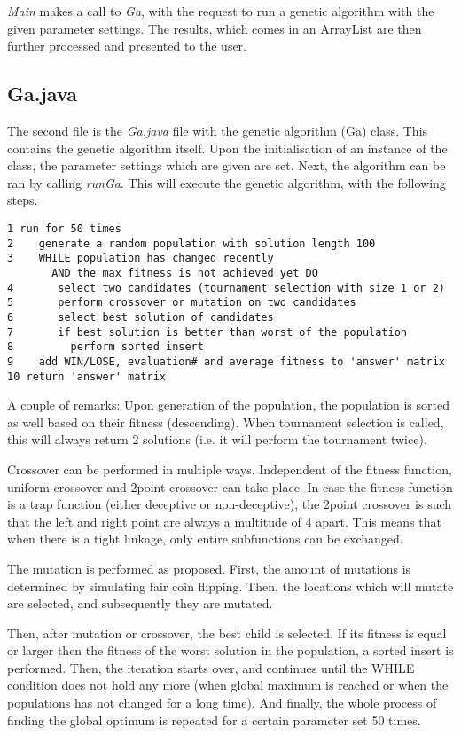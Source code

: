 \documentclass[10pt,a4paper,onecolumn]{article}
\begin{document}
\textit{Main} makes a call to \textit{Ga}, with the request to run a genetic algorithm with the given parameter settings. The results, which comes in an ArrayList are then further processed and presented to the user.


\subsection{Ga.java}
The second file is the \textit{Ga.java} file with the genetic algorithm (Ga) class. This contains the genetic algorithm itself. Upon the initialisation of an instance of the class, the parameter settings which are given are set. Next, the algorithm can be ran by calling \textit{runGa}. This will execute the genetic algorithm, with the following steps.

\begin{verbatim}
1 run for 50 times
2    generate a random population with solution length 100
3    WHILE population has changed recently 
       AND the max fitness is not achieved yet DO
4       select two candidates (tournament selection with size 1 or 2)
5       perform crossover or mutation on two candidates
6       select best solution of candidates
7       if best solution is better than worst of the population
8         perform sorted insert
9    add WIN/LOSE, evaluation# and average fitness to 'answer' matrix
10 return 'answer' matrix
\end{verbatim}

A couple of remarks: Upon generation of the population, the population is sorted as well based on their fitness (descending). When tournament selection is called, this will always return 2 solutions (i.e. it will perform the tournament twice). 

Crossover can be performed in multiple ways. Independent of the fitness function, uniform crossover and 2point crossover can take place. In case the fitness function is a trap function (either deceptive or non-deceptive), the 2point crossover is such that the left and right point are always a multitude of 4 apart. This means that when there is a tight linkage, only entire subfunctions can be exchanged.

The mutation is performed as proposed. First, the amount of mutations is determined by simulating fair coin flipping. Then, the locations which will mutate are selected, and subsequently they are mutated.

Then, after mutation or crossover, the best child is selected. If its fitness is equal or larger then the fitness of the worst solution in the population, a sorted insert is performed. Then, the iteration starts over, and continues until the WHILE condition does not hold any more (when global maximum is reached or when the populations has not changed for a long time). And finally, the whole process of finding the global optimum is repeated for a certain parameter set 50 times.
\end{document}
